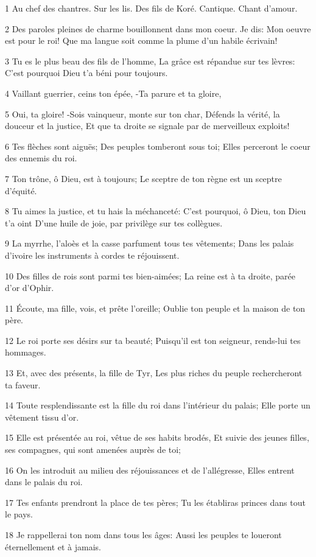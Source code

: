 \par 1 Au chef des chantres. Sur les lis. Des fils de Koré. Cantique. Chant d'amour.
\par 2 Des paroles pleines de charme bouillonnent dans mon coeur. Je dis: Mon oeuvre est pour le roi! Que ma langue soit comme la plume d'un habile écrivain!
\par 3 Tu es le plus beau des fils de l'homme, La grâce est répandue sur tes lèvres: C'est pourquoi Dieu t'a béni pour toujours.
\par 4 Vaillant guerrier, ceins ton épée, -Ta parure et ta gloire,
\par 5 Oui, ta gloire! -Sois vainqueur, monte sur ton char, Défends la vérité, la douceur et la justice, Et que ta droite se signale par de merveilleux exploits!
\par 6 Tes flèches sont aiguës; Des peuples tomberont sous toi; Elles perceront le coeur des ennemis du roi.
\par 7 Ton trône, ô Dieu, est à toujours; Le sceptre de ton règne est un sceptre d'équité.
\par 8 Tu aimes la justice, et tu hais la méchanceté: C'est pourquoi, ô Dieu, ton Dieu t'a oint D'une huile de joie, par privilège sur tes collègues.
\par 9 La myrrhe, l'aloès et la casse parfument tous tes vêtements; Dans les palais d'ivoire les instruments à cordes te réjouissent.
\par 10 Des filles de rois sont parmi tes bien-aimées; La reine est à ta droite, parée d'or d'Ophir.
\par 11 Écoute, ma fille, vois, et prête l'oreille; Oublie ton peuple et la maison de ton père.
\par 12 Le roi porte ses désirs sur ta beauté; Puisqu'il est ton seigneur, rends-lui tes hommages.
\par 13 Et, avec des présents, la fille de Tyr, Les plus riches du peuple rechercheront ta faveur.
\par 14 Toute resplendissante est la fille du roi dans l'intérieur du palais; Elle porte un vêtement tissu d'or.
\par 15 Elle est présentée au roi, vêtue de ses habits brodés, Et suivie des jeunes filles, ses compagnes, qui sont amenées auprès de toi;
\par 16 On les introduit au milieu des réjouissances et de l'allégresse, Elles entrent dans le palais du roi.
\par 17 Tes enfants prendront la place de tes pères; Tu les établiras princes dans tout le pays.
\par 18 Je rappellerai ton nom dans tous les âges: Aussi les peuples te loueront éternellement et à jamais.


